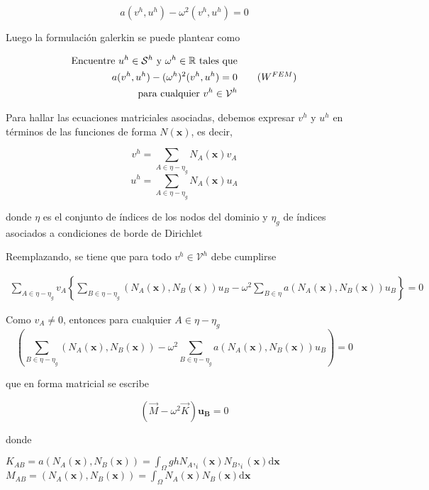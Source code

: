 $$ a(v^h, u^h) - \omega^2 (v^h, u^h) = 0 $$

Luego la formulaci\'on galerkin se puede plantear como

\begin{equation}
  \begin{split}
  \text{Encuentre $u^h\in\mathcal{S}^h$ y $\omega^h \in \mathbb{R}$  tales que} \\
    a(v^h,u^h) - (\omega^h)^2 (v^h,u^h) = 0 \\
    \text{ para cualquier $v^h \in \mathcal{V}^h$}
  \end{split}
  \tag{\text{$W^{FEM}$}}
\end{equation}


Para hallar las ecuaciones matriciales asociadas, debemos expresar $v^h$ y $u^h$ en t\'erminos de las funciones de forma $N(\boldsymbol{x})$, es decir, 

$$v^h = \sum_{A \in \eta-\eta_g}N_A(\boldsymbol{x})v_A$$
$$u^h = \sum_{A \in \eta-\eta_g}N_A(\boldsymbol{x})u_A$$

donde 
$\eta$ es el conjunto de \'indices de los  nodos del dominio y $\eta_g$ de \'indices asociados a condiciones de borde de Dirichlet

Reemplazando, se tiene que para todo $ v^h\in \mathcal{V}^h$ debe cumplirse

\begin{equation*}
\begin{split}
\sum_{A \in \eta-\eta_g} v_A 
\left \{
\sum_{B \in \eta-\eta_g}(N_A(\boldsymbol{x}), N_B(\boldsymbol{x})) u_B - 
\omega^2 \sum_{B \in \eta} a(N_A(\boldsymbol{x}), N_B(\boldsymbol{x})) u_B 
\right \} = 0
\end{split}
\end{equation*}

Como $v_A \neq 0$, entonces para cualquier $A\in \eta-\eta_g$
$$\left( \sum_{B \in \eta-\eta_g}(N_A(\boldsymbol{x}), N_B(\boldsymbol{x})) - 
\omega^2 \sum_{B \in \eta-\eta_g} a(N_A(\boldsymbol{x}), N_B(\boldsymbol{x})) u_B\right) =0 $$

que en forma matricial se escribe 

$$(\vec M - \omega^2 \vec K)\boldsymbol{u_B} = 0$$

donde 

$K_{AB} = a(N_A(\boldsymbol{x}), N_B(\boldsymbol{x})) = \int_{\Omega} gh N_A,_i(\boldsymbol{x}) N_B,_i(\boldsymbol{x}) \mathrm{d}\boldsymbol{x} $\\

$M_{AB} = (N_A(\boldsymbol{x}), N_B(\boldsymbol{x})) = \int_{\Omega} N_A(\boldsymbol{x}) N_B(\boldsymbol{x}) \mathrm{d}\boldsymbol{x} $\\

